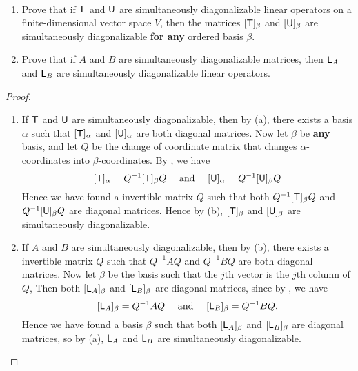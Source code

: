 \begin{exercise} \label{exercise 5.2.18} \ 

\begin{enumerate}
\sloppy \item Prove that if \(\textsf{T}\) and \(\textsf{U}\) are simultaneously diagonalizable linear operators on a finite-dimensional vector space \(V\), then the matrices \([\textsf{T}]_{\beta}\) and \([\textsf{U}]_{\beta}\) are simultaneously diagonalizable \textbf{for any} ordered basis \(\beta\).
\item Prove that if \(A\) and \(B\) are simultaneously diagonalizable matrices, then \(\textsf{L}_A\) and \(\textsf{L}_B\) are simultaneously diagonalizable linear operators.
\end{enumerate}
\end{exercise}

\begin{proof} \ 

\begin{enumerate}
\item If \(\textsf{T}\) and \(\textsf{U}\) are simultaneously diagonalizable, then by (a), there exists a basis \(\alpha\) such that \([\textsf{T}]_{\alpha}\) and \([\textsf{U}]_{\alpha}\) are both diagonal matrices.
Now let \(\beta\) be \textbf{any} basis, and let \(Q\) be the change of coordinate matrix that changes \(\alpha\)-coordinates into \(\beta\)-coordinates.
By , we have
\[
    [\textsf{T}]_{\alpha} = Q^{-1} [\textsf{T}]_{\beta} Q
    \quad \text{ and } \quad
    [\textsf{U}]_{\alpha} = Q^{-1} [\textsf{U}]_{\beta} Q
\]
Hence we have found a invertible matrix \(Q\) such that both \(Q^{-1} [\textsf{T}]_{\beta} Q\) and \(Q^{-1} [\textsf{U}]_{\beta} Q\) are diagonal matrices.
Hence by (b), \([\textsf{T}]_{\beta}\) and \([\textsf{U}]_{\beta}\) are simultaneously diagonalizable.

\item If \(A\) and \(B\) are simultaneously diagonalizable, then by (b), there exists a invertible matrix \(Q\) such that \(Q^{-1} A Q\) and \(Q^{-1} B Q\) are both diagonal matrices.
Now let \(\beta\) be the basis such that the \(j\)th vector is the \(j\)th column of \(Q\),
Then both \([\textsf{L}_A]_{\beta}\) and \([\textsf{L}_B]_{\beta}\) are diagonal matrices, since by , we have
\[
    [\textsf{L}_A]_{\beta} = Q^{-1} A Q
    \quad \text{ and } \quad
    [\textsf{L}_B]_{\beta} = Q^{-1} B Q.
\]
Hence we have found a basis \(\beta\) such that both \([\textsf{L}_A]_{\beta}\) and \([\textsf{L}_B]_{\beta}\) are diagonal matrices,
so by (a), \(\textsf{L}_A\) and \(\textsf{L}_B\) are simultaneously diagonalizable.
\end{enumerate}
\end{proof}


